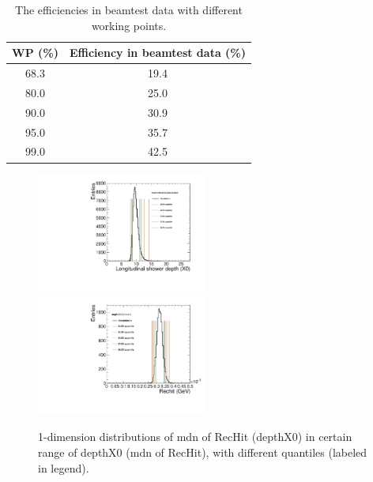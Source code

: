 \begin{table}[!ht]
  \begin{center}
    {
    \begin{tabular}{cc}
    	WP (\%) &  Efficiency in beamtest data (\%) \\
    	\hline
    	68.3 & 19.4 \\
    	80.0 & 25.0 \\
    	90.0 & 30.9 \\
    	95.0 & 35.7 \\
    	99.0 & 42.5 \\
    \end{tabular}
    }
  \end{center}
  \caption{The efficiencies in beamtest data with different working points.  \label{tab:Window-EffData}}
\end{table}

\begin{figure}[!ht]
    \begin{center}  
    \includegraphics[width=0.5\textwidth]{Fig/fig_HGCAL/depthX0-Rechit2p95e-04to3p00e-04}~
    \includegraphics[width=0.5\textwidth]{Fig/fig_HGCAL/Rechit-depthX09p0to9p2}\\
    \caption{1-dimension distributions of mdn of RecHit (depthX0) in certain range of depthX0 (mdn of RecHit), with different quantiles (labeled in legend).}
    \label{fig:1DHist-quantile}
    \end{center}
\end{figure}

